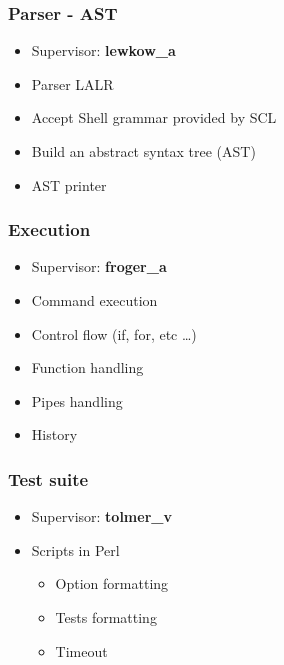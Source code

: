 \begin{frame}
\frametitle{Parser - AST}
  \begin{itemize}[<+->]
    \item Supervisor: \textbf{lewkow\_a}
    \item Parser LALR
    \item Accept Shell grammar provided by SCL
    \item Build an abstract syntax tree (AST)
    \item AST printer
  \end{itemize}
\end{frame}

\begin{frame}
\frametitle{Execution}
  \begin{itemize}[<+->]
    \item Supervisor: \textbf{froger\_a}
    \item Command execution
    \item Control flow (if, for, etc \ldots)
    \item Function handling
    \item Pipes handling
    \item History
  \end{itemize}
\end{frame}

\begin{frame}
\frametitle{Test suite}
  \begin{itemize}[<+->]
    \item Supervisor: \textbf{tolmer\_v}
    \item Scripts in Perl
      \begin{itemize}[<+->]
        \item Option formatting
        \item Tests formatting
        \item Timeout
      \end{itemize}
  \end{itemize}
\end{frame}
